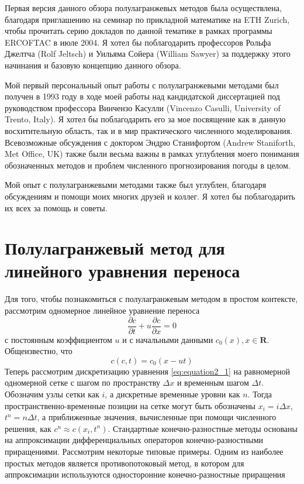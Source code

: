 Первая версия данного обзора полулагранжевых методов была осуществлена, благодаря приглашению на семинар по прикладной математике на ETH Zurich, чтобы прочитать серию докладов по данной тематике в рамках программы ERCOFTAC в июле 2004. Я хотел бы поблагодарить профессоров Рольфа Джелтча (Rolf Jeltsch) и Уильяма Сойера (William Sawyer) за поддержку этого начинания и базовую концепцию данного обзора.

Мой первый персональный опыт работы с полулагранжевыми методами был получен в 1993 году в ходе моей работы над кандидатской диссертацией под руководством профессора Винчензо Касулли (Vincenzo Casulli, University of Trento, Italy). Я хотел бы поблагодарить его за мое посвящение как в данную восхитительную область, так и в мир практического численного моделирования. Всевозможные обсуждения с доктором Эндрю Станифортом (Andrew Staniforth, Met Office, UK) также были весьма важны в рамках углубления моего понимания обозначенных методов и проблем численного прогнозирования погоды в целом.

Мой опыт с полулагранжевыми методами также был углублен, благодаря обсуждениям и помощи моих многих друзей и коллег. Я хотел бы поблагодарить их всех за помощь и советы.

\newpage

\chapter{Полулагранжевый метод для линейного уравнения переноса} \label{chapt_2}
Для того, чтобы познакомиться с полулагранжевым методом в простом контексте, рассмотрим одномерное линейное уравнение переноса
%
\begin{equation}
\label{eq:equation2_1}
\frac{\partial c}{\partial t} + u\frac{\partial c}{\partial x} = 0
\end{equation}
%
с постоянным коэффициентом $u$ и с начальными данными $c_0(x), x\in{\mathbf{R}}$. Общеизвестно, что
%
\begin{equation}
\label{eq:equation2_2}
c(c,t)=c_0(x - ut)
\end{equation}
%
Теперь рассмотрим дискретизацию уравнения \eqref{eq:equation2_1} на равномерной одномерной сетке с шагом по пространству $\Delta x$ и временным шагом $\Delta t$. Обозначим узлы сетки как $i$, а дискретные временные уровни как $n$. Тогда пространственно-временные позиции на сетке могут быть обозначены $x_i=i\Delta{x}$, $t^n=n\Delta{t}$, а приближенные значения, вычисленные при помощи численного решения, как $c^n\approx c(x_i, t^n)$. Стандартные конечно-разностные методы основаны на аппроксимации дифференциальных операторов конечно-разностными приращениями. Рассмотрим некоторые типовые примеры. Одним из наиболее простых методов является противопотоковый метод, в котором для аппроксимации используются односторонние конечно-разностные приращения

